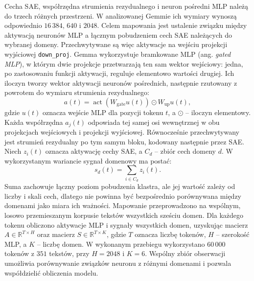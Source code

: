 Cecha SAE, współrzędna strumienia rezydualnego i neuron pośredni MLP należą do trzech różnych przestrzeni. W analizowanej Gemmie ich wymiary wynoszą odpowiednio $16\,384$, $640$ i $2048$. Celem mapowania jest ustalenie związku między aktywacją neuronów MLP a łącznym pobudzeniem cech SAE należących do wybranej domeny. \newline
Przechwytywane są więc aktywacje na wejściu projekcji wyjściowej \texttt{down\_proj}. Gemma wykorzystuje bramkowane MLP (ang. \textit{gated MLP}), w którym dwie projekcje przetwarzają ten sam wektor wejściowy: jedna, po zastosowaniu funkcji aktywacji, reguluje elementowo wartości drugiej. Ich iloczyn tworzy wektor aktywacji neuronów pośrednich, następnie rzutowany z powrotem do wymiaru strumienia rezydualnego:
\[
a(t)=\operatorname{act}(W_{\mathrm{gate}}u(t))
\odot W_{\mathrm{up}}u(t),
\]
gdzie $u(t)$ oznacza wejście MLP dla pozycji tokenu $t$, a $\odot$ -- iloczyn elementowy. Każda współrzędna $a_j(t)$ odpowiada tej samej osi wewnętrznej w obu projekcjach wejściowych i projekcji wyjściowej. Równocześnie przechwytywany jest strumień rezydualny po tym samym bloku, kodowany następnie przez SAE. \newline
Niech $z_i(t)$ oznacza aktywację cechy SAE, a $C_d$ -- zbiór cech domeny $d$. W wykorzystanym wariancie sygnał domenowy ma postać:
\[
s_d(t)=\sum_{i\in C_d}z_i(t).
\]
Suma zachowuje łączny poziom pobudzenia klastra, ale jej wartość zależy od liczby i skali cech, dlatego nie powinna być bezpośrednio porównywana między domenami jako miara ich ważności. \newline
Mapowanie przeprowadzono na wspólnym, losowo przemieszanym korpusie tekstów wszystkich sześciu domen. Dla każdego tokenu obliczono aktywacje MLP i sygnały wszystkich domen, uzyskując macierz $A\in\mathbb{R}^{T\times H}$ oraz macierz $S\in\mathbb{R}^{T\times K}$, gdzie $T$ oznacza liczbę tokenów, $H$ -- szerokość MLP, a $K$ -- liczbę domen. W wykonanym przebiegu wykorzystano $60\,000$ tokenów z $351$ tekstów, przy $H=2048$ i $K=6$. Wspólny zbiór obserwacji umożliwia porównywanie związków neuronu z różnymi domenami i pozwala współdzielić obliczenia modelu. \newline
